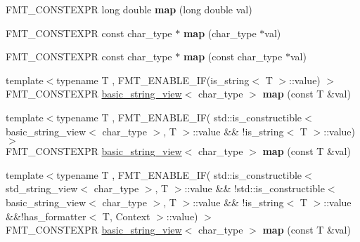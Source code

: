 \begin{DoxyCompactItemize}
F\+M\+T\+\_\+\+C\+O\+N\+S\+T\+E\+X\+PR long double {\bfseries map} (long double val)
\item 
\mbox{\label{structinternal_1_1arg__mapper_a0b897c05c5ec29945cbe7674386af5f0}} 
F\+M\+T\+\_\+\+C\+O\+N\+S\+T\+E\+X\+PR const char\+\_\+type $\ast$ {\bfseries map} (char\+\_\+type $\ast$val)
\item 
\mbox{\label{structinternal_1_1arg__mapper_a0d670e13df58b4bd234344fe5ccf5b65}} 
F\+M\+T\+\_\+\+C\+O\+N\+S\+T\+E\+X\+PR const char\+\_\+type $\ast$ {\bfseries map} (const char\+\_\+type $\ast$val)
\item 
\mbox{\label{structinternal_1_1arg__mapper_a0b1ab2d664a65e32a317a90583cf19ca}} 
{\footnotesize template$<$typename T , F\+M\+T\+\_\+\+E\+N\+A\+B\+L\+E\+\_\+\+I\+F(is\+\_\+string$<$ T $>$\+::value) $>$ }\\F\+M\+T\+\_\+\+C\+O\+N\+S\+T\+E\+X\+PR \hyperlink{classbasic__string__view}{basic\+\_\+string\+\_\+view}$<$ char\+\_\+type $>$ {\bfseries map} (const T \&val)
\item 
\mbox{\label{structinternal_1_1arg__mapper_a0b1ab2d664a65e32a317a90583cf19ca}} 
{\footnotesize template$<$typename T , F\+M\+T\+\_\+\+E\+N\+A\+B\+L\+E\+\_\+\+I\+F( std\+::is\+\_\+constructible$<$ basic\+\_\+string\+\_\+view$<$ char\+\_\+type $>$, T $>$\+::value \&\& !is\+\_\+string$<$ T $>$\+::value) $>$ }\\F\+M\+T\+\_\+\+C\+O\+N\+S\+T\+E\+X\+PR \hyperlink{classbasic__string__view}{basic\+\_\+string\+\_\+view}$<$ char\+\_\+type $>$ {\bfseries map} (const T \&val)
\item 
\mbox{\label{structinternal_1_1arg__mapper_a0b1ab2d664a65e32a317a90583cf19ca}} 
{\footnotesize template$<$typename T , F\+M\+T\+\_\+\+E\+N\+A\+B\+L\+E\+\_\+\+I\+F( std\+::is\+\_\+constructible$<$ std\+\_\+string\+\_\+view$<$ char\+\_\+type $>$, T $>$\+::value \&\& !std\+::is\+\_\+constructible$<$ basic\+\_\+string\+\_\+view$<$ char\+\_\+type $>$, T $>$\+::value \&\& !is\+\_\+string$<$ T $>$\+::value \&\&!has\+\_\+formatter$<$ T, Context $>$\+::value) $>$ }\\F\+M\+T\+\_\+\+C\+O\+N\+S\+T\+E\+X\+PR \hyperlink{classbasic__string__view}{basic\+\_\+string\+\_\+view}$<$ char\+\_\+type $>$ {\bfseries map} (const T \&val)

\end{DoxyCompactItemize}
